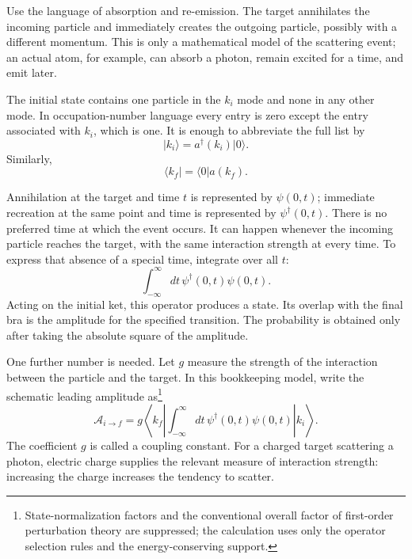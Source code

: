Use the language of absorption and re-emission. The target annihilates the incoming particle and immediately creates the outgoing particle, possibly with a different momentum. This is only a mathematical model of the scattering event; an actual atom, for example, can absorb a photon, remain excited for a time, and emit later.

\begin{classroomqa}
\end{classroomqa}

The initial state contains one particle in the \(k_i\) mode and none in any other mode. In occupation-number language every entry is zero except the entry associated with \(k_i\), which is one. It is enough to abbreviate the full list by
\begin{equation}
\lvert k_i\rangle=a^\dagger(k_i)\lvert0\rangle.
\end{equation}
Similarly,
\begin{equation}
\langle k_f\rvert=\langle0\rvert a(k_f).
\end{equation}

Annihilation at the target and time \(t\) is represented by \(\psi(0,t)\); immediate recreation at the same point and time is represented by \(\psi^\dagger(0,t)\). There is no preferred time at which the event occurs. It can happen whenever the incoming particle reaches the target, with the same interaction strength at every time. To express that absence of a special time, integrate over all \(t\):
\begin{equation}
\int_{-\infty}^{\infty}dt\,\psi^\dagger(0,t)\psi(0,t).
\end{equation}
Acting on the initial ket, this operator produces a state. Its overlap with the final bra is the amplitude for the specified transition. The probability is obtained only after taking the absolute square of the amplitude.

One further number is needed. Let \(g\) measure the strength of the interaction between the particle and the target. In this bookkeeping model, write the schematic leading amplitude as\footnote{State-normalization factors and the conventional overall factor of first-order perturbation theory are suppressed; the calculation uses only the operator selection rules and the energy-conserving support.}
\begin{equation}
\mathcal A_{i\to f}
=g\left\langle k_f\left|
\int_{-\infty}^{\infty}dt\,
\psi^\dagger(0,t)\psi(0,t)
\right|k_i\right\rangle.
\end{equation}
The coefficient \(g\) is called a coupling constant. For a charged target scattering a photon, electric charge supplies the relevant measure of interaction strength: increasing the charge increases the tendency to scatter.

